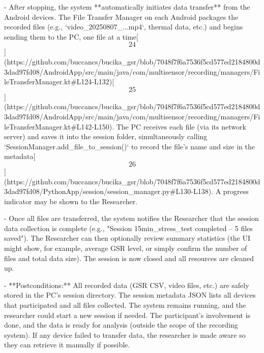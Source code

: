 \documentclass[12pt,a4paper]{article}
\begin{document}
- After stopping, the system **automatically initiates data transfer**
  from the Android devices. The File Transfer Manager on each Android
  packages the recorded files (e.g., `video_20250807_...mp4`, thermal
  data, etc.) and begins sending them to the PC, one file at a
  time[\[24\]](https://github.com/buccancs/bucika_gsr/blob/7048f7f6a7536f5cd577ed2184800d3dad97fd08/AndroidApp/src/main/java/com/multisensor/recording/managers/FileTransferManager.kt#L124-L132)[\[25\]](https://github.com/buccancs/bucika_gsr/blob/7048f7f6a7536f5cd577ed2184800d3dad97fd08/AndroidApp/src/main/java/com/multisensor/recording/managers/FileTransferManager.kt#L142-L150).
  The PC receives each file (via its network server) and saves it into
  the session folder, simultaneously calling
  `SessionManager.add_file_to_session()` to record the file's name and
  size in the
  metadata[\[26\]](https://github.com/buccancs/bucika_gsr/blob/7048f7f6a7536f5cd577ed2184800d3dad97fd08/PythonApp/session/session_manager.py#L130-L138).
  A progress indicator may be shown to the Researcher.

- Once all files are transferred, the system notifies the Researcher
  that the session data collection is complete (e.g., "Session
  15min_stress_test completed -- 5 files saved"). The Researcher can
  then optionally review summary statistics (the UI might show, for
  example, average GSR level, or simply confirm the number of files and
  total data size). The session is now closed and all resources are
  cleaned up.

- **Postconditions:** All recorded data (GSR CSV, video files, etc.) are
  safely stored in the PC's session directory. The session metadata JSON
  lists all devices that participated and all files collected. The
  system remains running, and the researcher could start a new session
  if needed. The participant's involvement is done, and the data is
  ready for analysis (outside the scope of the recording system). If any
  device failed to transfer data, the researcher is made aware so they
  can retrieve it manually if possible.
\end{document}
